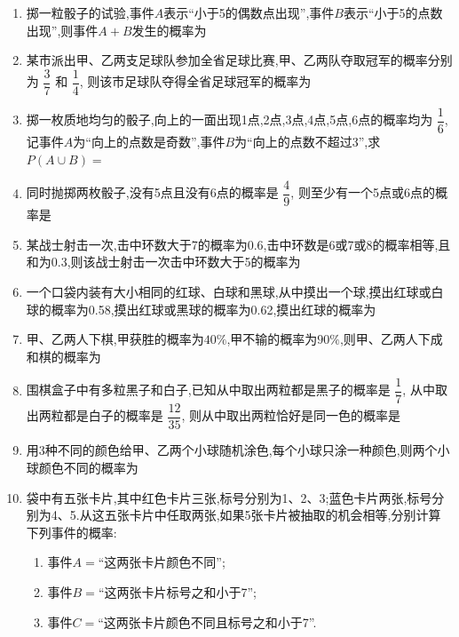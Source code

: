 \begin{enumerate}

\item 掷一粒骰子的试验,事件$A$表示“小于5的偶数点出现”,事件$B$表示“小于5的点数出现”,则事件$A+B$发生的概率为

\item 某市派出甲、乙两支足球队参加全省足球比赛,甲、乙两队夺取冠军的概率分别为 $\dfrac{3}{7}$ 和 $\dfrac{1}{4}$, 则该市足球队夺得全省足球冠军的概率为

\item 掷一枚质地均匀的骰子,向上的一面出现1点,2点,3点,4点,5点,6点的概率均为 $\dfrac{1}{6}$, 记事件$A$为“向上的点数是奇数”,事件$B$为“向上的点数不超过3”,求$P(A\cup B)=$

\item 同时抛掷两枚骰子,没有5点且没有6点的概率是 $\dfrac{4}{9}$, 则至少有一个5点或6点的概率是

\item 某战士射击一次,击中环数大于7的概率为0.6,击中环数是6或7或8的概率相等,且和为0.3,则该战士射击一次击中环数大于5的概率为

\item 一个口袋内装有大小相同的红球、白球和黑球,从中摸出一个球,摸出红球或白球的概率为0.58,摸出红球或黑球的概率为0.62,摸出红球的概率为

\item 甲、乙两人下棋,甲获胜的概率为$40\%$,甲不输的概率为$90\%$,则甲、乙两人下成和棋的概率为

\item 围棋盒子中有多粒黑子和白子,已知从中取出两粒都是黑子的概率是 $\dfrac{1}{7}$, 从中取出两粒都是白子的概率是 $\dfrac{12}{35}$, 则从中取出两粒恰好是同一色的概率是

\item 用3种不同的颜色给甲、乙两个小球随机涂色,每个小球只涂一种颜色,则两个小球颜色不同的概率为

\item 袋中有五张卡片,其中红色卡片三张,标号分别为1、2、3;蓝色卡片两张,标号分别为4、5.从这五张卡片中任取两张,如果5张卡片被抽取的机会相等,分别计算下列事件的概率:
\begin{enumerate}
\item 事件$A=$“这两张卡片颜色不同”;
\item 事件$B=$“这两张卡片标号之和小于7”;
\item 事件$C=$“这两张卡片颜色不同且标号之和小于7”.
\end{enumerate}


\end{enumerate}
